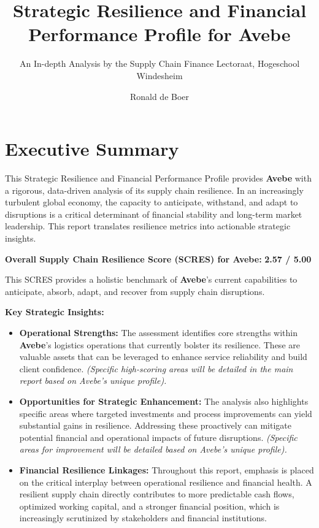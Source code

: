 \documentclass[
  oneside,
  open=any,
  fontsize=11pt]{scrbook}
\title{Strategic Resilience and Financial Performance Profile for Avebe}
\subtitle{An In-depth Analysis by the Supply Chain Finance Lectoraat,
Hogeschool Windesheim}
\author{Ronald de Boer}
\date{}
\providecommand{\tightlist}{%
  \setlength{\itemsep}{0pt}\setlength{\parskip}{0pt}}
\renewcommand*\contentsname{Table of contents}
\newcommand\contentsname{Table of contents}
\begin{document}
\frontmatter
\maketitle

\renewcommand*\contentsname{Table of contents}
{
\setcounter{tocdepth}{2}
\tableofcontents
}
\listoffigures
\listoftables

\mainmatter
\newpage

\chapter{Executive Summary}\label{executive-summary}

This Strategic Resilience and Financial Performance Profile provides
\textbf{Avebe} with a rigorous, data-driven analysis of its supply chain
resilience. In an increasingly turbulent global economy, the capacity to
anticipate, withstand, and adapt to disruptions is a critical
determinant of financial stability and long-term market leadership. This
report translates resilience metrics into actionable strategic insights.

\textbf{Overall Supply Chain Resilience Score (SCRES) for Avebe:}
\textbf{2.57 / 5.00}

This SCRES provides a holistic benchmark of \textbf{Avebe}'s current
capabilities to anticipate, absorb, adapt, and recover from supply chain
disruptions.

\textbf{Key Strategic Insights:}

\begin{itemize}
\tightlist
\item
  \textbf{Operational Strengths:} The assessment identifies core
  strengths within \textbf{Avebe}'s logistics operations that currently
  bolster its resilience. These are valuable assets that can be
  leveraged to enhance service reliability and build client confidence.
  \emph{(Specific high-scoring areas will be detailed in the main report
  based on Avebe's unique profile).}
\item
  \textbf{Opportunities for Strategic Enhancement:} The analysis also
  highlights specific areas where targeted investments and process
  improvements can yield substantial gains in resilience. Addressing
  these proactively can mitigate potential financial and operational
  impacts of future disruptions. \emph{(Specific areas for improvement
  will be detailed based on Avebe's unique profile).}
\item
  \textbf{Financial Resilience Linkages:} Throughout this report,
  emphasis is placed on the critical interplay between operational
  resilience and financial health. A resilient supply chain directly
  contributes to more predictable cash flows, optimized working capital,
  and a stronger financial position, which is increasingly scrutinized
  by stakeholders and financial institutions.
\end{itemize}
\end{document}

